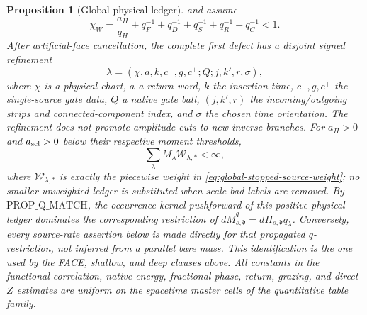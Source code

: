 \documentclass[11pt]{article}
\newtheorem{proposition}[theorem]{Proposition}
\begin{document}
\begin{proposition}[Global physical ledger]
and assume
\begin{equation}
\label{eq:holder-conjugate-margin}
 \chi_W=\frac{a_H}{q_H}+q_F^{-1}+q_D^{-1}+q_S^{-1}+q_R^{-1}
        +q_C^{-1}<1.
\end{equation}
After artificial-face cancellation, the complete first defect has a disjoint
signed refinement
\begin{equation}
\label{eq:global-label}
 \lambda=(\chi,a,k,c^-,g,c^+;Q;j,k',r,\sigma),
\end{equation}
where $\chi$ is a physical chart, $a$ a return word, $k$ the insertion time,
$c^-,g,c^+$ the single-source gate data, $Q$ a native gate ball,
$(j,k',r)$ the incoming/outgoing strips and connected-component index, and
$\sigma$ the chosen time orientation.  The refinement does not promote
amplitude cuts to new inverse branches.  For $a_H>0$ and $a_{\rm scl}>0$
below their respective moment thresholds,
\begin{equation}
\label{eq:global-ledger-sum}
\sum_\lambda M_\lambda\mathscr W_{\lambda,*}<\infty,
\end{equation}
where $\mathscr W_{\lambda,*}$ is exactly the piecewise weight in
\eqref{eq:global-stopped-source-weight}; no smaller unweighted ledger is substituted
when scale-bad labels are removed.  By $\mathrm{PROP\_Q\_MATCH}$, the
occurrence-kernel pushforward of this positive physical ledger dominates the
corresponding restriction of
$d\overline M_{s,\mathfrak d}^{q}
=d\Pi_{s,\mathfrak d}q_\lambda$.  Conversely, every
source-rate assertion below is made directly for that propagated
$q$-restriction, not inferred from a parallel bare mass.  This identification
is the one used by the FACE, shallow, and deep clauses above.
All constants in the functional-correlation, native-energy,
fractional-phase, return, grazing, and direct-$Z$ estimates are uniform on
the spacetime master cells of the quantitative table family.
\end{proposition}
\end{document}

